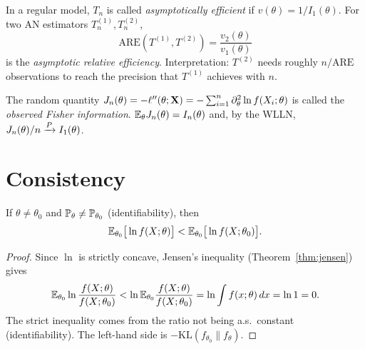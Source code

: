 \documentclass[main.tex]{subfiles}
\begin{document}
\begin{definition}
In a regular model, $T_n$ is called \emph{asymptotically efficient} if $v(\theta)=1/I_1(\theta)$. For two AN estimators $T_n^{(1)},T_n^{(2)}$,
\[
\mathrm{ARE}(T^{(1)},T^{(2)})=\frac{v_2(\theta)}{v_1(\theta)}
\]
is the \emph{asymptotic relative efficiency}. Interpretation: $T^{(2)}$ needs roughly $n/\mathrm{ARE}$ observations to reach the precision that $T^{(1)}$ achieves with $n$.
\end{definition}

\begin{definition}
The random quantity $J_n(\theta)=-\ell''(\theta;\X)=-\sum_{i=1}^n\partial^2_\theta\ln f(X_i;\theta)$ is called the \emph{observed Fisher information}. $\E_\theta J_n(\theta)=I_n(\theta)$ and, by the WLLN, $J_n(\theta)/n\pto I_1(\theta)$.
\end{definition}

\section{Consistency}

\begin{lemma}\label{lem:bilgi-esitsizligi}
If $\theta\neq\theta_0$ and $\P_\theta\neq\P_{\theta_0}$ (identifiability), then
\[
\E_{\theta_0}\big[\ln f(X;\theta)\big]<\E_{\theta_0}\big[\ln f(X;\theta_0)\big].
\]
\end{lemma}
\begin{proof}
Since $\ln$ is strictly concave, Jensen's inequality (Theorem~\ref{thm:jensen}) gives
\[
\E_{\theta_0}\ln\frac{f(X;\theta)}{f(X;\theta_0)}<\ln\E_{\theta_0}\frac{f(X;\theta)}{f(X;\theta_0)}=\ln\int f(x;\theta)\,dx=\ln1=0 .
\]
The strict inequality comes from the ratio not being a.s.\ constant (identifiability). The left-hand side is $-\mathrm{KL}(f_{\theta_0}\|f_\theta)$.
\end{proof}
\end{document}
